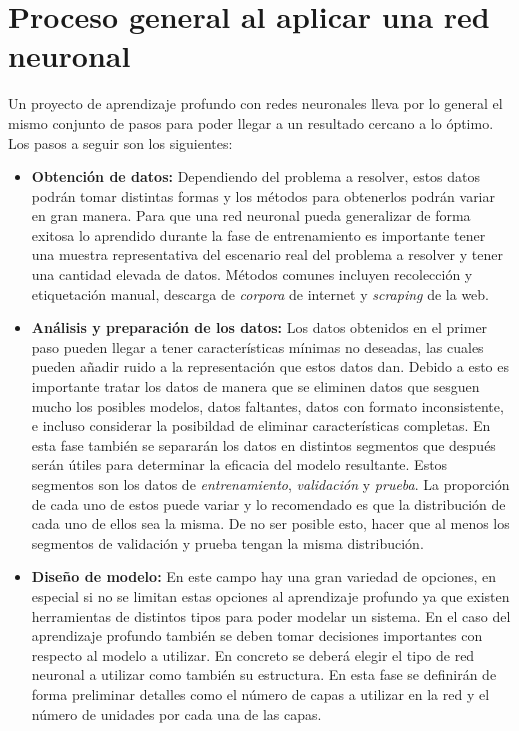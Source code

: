 \section{Proceso general al aplicar una red neuronal}
\label{sec:nlpprocess}

Un proyecto de aprendizaje profundo con redes neuronales lleva por lo general el mismo conjunto de pasos para poder llegar a un resultado cercano a lo óptimo. Los pasos a seguir son los siguientes:

\begin{itemize}
\item \textbf{Obtención de datos:} Dependiendo del problema a resolver, estos datos podrán tomar distintas formas y los métodos para obtenerlos podrán variar en gran manera. Para que una red neuronal pueda generalizar de forma exitosa lo aprendido durante la fase de entrenamiento es importante tener una muestra representativa del escenario real del problema a resolver y tener una cantidad elevada de datos. Métodos comunes incluyen recolección y etiquetación manual, descarga de \textit{corpora} de internet y \textit{scraping} de la web.

\item \textbf{Análisis y preparación de los datos:} Los datos obtenidos en el primer paso pueden llegar a tener características mínimas no deseadas, las cuales pueden añadir ruido a la representación que estos datos dan. Debido a esto es importante tratar los datos de manera que se eliminen datos que sesguen mucho los posibles modelos, datos faltantes, datos con formato inconsistente, e incluso considerar la posibildad de eliminar características completas. En esta fase también se separarán los datos en distintos segmentos que después serán útiles para determinar la eficacia del modelo resultante. Estos segmentos son los datos de \textit{entrenamiento}, \textit{validación} y \textit{prueba}. La proporción de cada uno de estos puede variar y lo recomendado es que la distribución de cada uno de ellos sea la misma. De no ser posible esto, hacer que al menos los segmentos de validación y prueba tengan la misma distribución.

\item \textbf{Diseño de modelo:} En este campo hay una gran variedad de opciones, en especial si no se limitan estas opciones al aprendizaje profundo ya que existen herramientas de distintos tipos para poder modelar un sistema. En el caso del aprendizaje profundo también se deben tomar decisiones importantes con respecto al modelo a utilizar. En concreto se deberá elegir el tipo de red neuronal a utilizar como también su estructura. En esta fase se definirán de forma preliminar detalles como el número de capas a utilizar en la red y el número de unidades por cada una de las capas.


\end{itemize}
